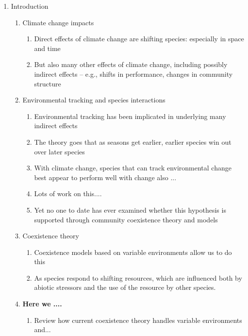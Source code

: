\documentclass[11pt,letterpaper]{article}
\begin{document}
\begin{enumerate}
\item Introduction
\begin{enumerate}
\item Climate change impacts
\begin{enumerate}
\item Direct effects of climate change are shifting species: especially in space and time %
\item But also many other effects of climate change, including possibly indirect effects -- e.g., shifts in performance, changes in community structure %
\end{enumerate}
\item Environmental tracking and species interactions
\begin{enumerate}
\item Environmental tracking has been implicated in underlying many indirect effects
\item The theory goes that as seasons get earlier, earlier species win out over later species
\item With climate change, species that can track environmental change best appear to perform well with change also ... 
\item Lots of work on this....
\item Yet no one to date has ever examined whether this hypothesis is supported through community coexistence theory and models
\end{enumerate}
\item Coexistence theory
\begin{enumerate}
\item Coexistence models based on variable environments allow us to do this
\item As species respond to shifting resources, which are
influenced both by abiotic stressors and the use of the resource by
other species.
\end{enumerate}
\item {\bf Here we ....}
\begin{enumerate}
\item Review how current coexistence theory handles variable environments and... 

\end{enumerate}
\end{enumerate}
\end{enumerate}
\end{document}
